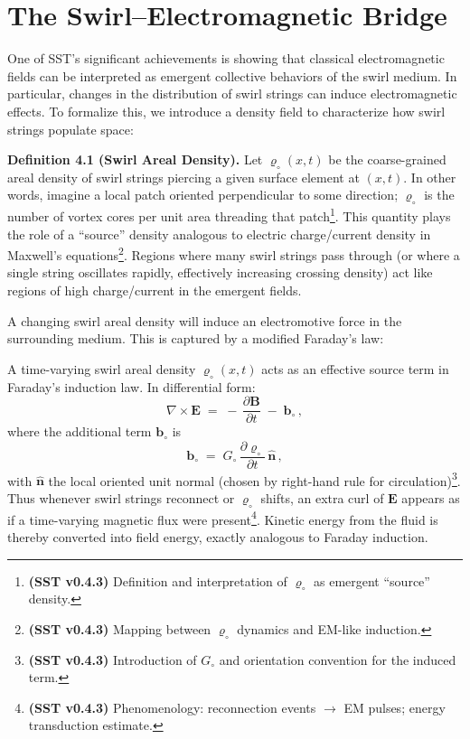 \documentclass[reprint,aps,onecolumn,nofootinbib]{revtex4-2}
\begin{document}
\section{The Swirl–Electromagnetic Bridge}
    One of SST’s significant achievements is showing that classical electromagnetic fields can be interpreted as emergent collective behaviors of the swirl medium. In particular, changes in the distribution of swirl strings can induce electromagnetic effects. To formalize this, we introduce a density field to characterize how swirl strings populate space:

    \textbf{Definition 4.1 (Swirl Areal Density).} Let $\varrho_{\circ}(x,t)$ be the coarse-grained areal density of swirl strings piercing a given surface element at $(x,t)$. In other words, imagine a local patch oriented perpendicular to some direction; $\varrho_{\circ}$ is the number of vortex cores per unit area threading that patch\footnote{\textbf{(SST v0.4.3)} Definition and interpretation of $\varrho_{\circ}$ as emergent “source” density.}. This quantity plays the role of a “source” density analogous to electric charge/current density in Maxwell’s equations\footnote{\textbf{(SST v0.4.3)} Mapping between $\varrho_{\circ}$ dynamics and EM-like induction.}. Regions where many swirl strings pass through (or where a single string oscillates rapidly, effectively increasing crossing density) act like regions of high charge/current in the emergent fields.

    A changing swirl areal density will induce an electromotive force in the surrounding medium. This is captured by a modified Faraday’s law:

    \begin{tcolorbox}[title=Theorem 4.1: Swirl-Induced Electromotive Force]
    A time-varying swirl areal density $\varrho_{\circ}(x,t)$ acts as an effective source term in Faraday’s induction law. In differential form:
    \[
        \nabla \times \mathbf{E} \;=\; -\,\frac{\partial \mathbf{B}}{\partial t}\;-\; \mathbf{b}_{\circ}\,,
    \]
    where the additional term $\mathbf{b}_{\circ}$ is
    \[
        \mathbf{b}_{\circ} \;=\; G_{\circ}\,\frac{\partial \varrho_{\circ}}{\partial t}\,\hat{\mathbf{n}}\,,
    \]
    with $\hat{\mathbf{n}}$ the local oriented unit normal (chosen by right-hand rule for circulation)\footnote{\textbf{(SST v0.4.3)} Introduction of $G_{\circ}$ and orientation convention for the induced term.}. Thus whenever swirl strings reconnect or $\varrho_{\circ}$ shifts, an extra curl of $\mathbf{E}$ appears as if a time-varying magnetic flux were present\footnote{\textbf{(SST v0.4.3)} Phenomenology: reconnection events $\to$ EM pulses; energy transduction estimate.}. Kinetic energy from the fluid is thereby converted into field energy, exactly analogous to Faraday induction.
    \end{tcolorbox}
\end{document}
